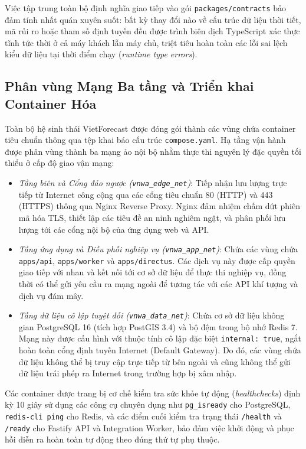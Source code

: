 Việc tập trung toàn bộ định nghĩa giao tiếp vào gói \texttt{packages/contracts} bảo đảm tính nhất quán xuyên suốt: bất kỳ thay đổi nào về cấu trúc dữ liệu thời tiết, mã rủi ro hoặc tham số định tuyến đều được trình biên dịch TypeScript xác thực tĩnh tức thời ở cả máy khách lẫn máy chủ, triệt tiêu hoàn toàn các lỗi sai lệch kiểu dữ liệu tại thời điểm chạy (\textit{runtime type errors}).

\subsection{Phân vùng Mạng Ba tầng và Triển khai Container Hóa}
Toàn bộ hệ sinh thái VietForecast được đóng gói thành các vùng chứa container tiêu chuẩn thông qua tệp khai báo cấu trúc \texttt{compose.yaml}. Hạ tầng vận hành được phân vùng thành ba mạng ảo nội bộ nhằm thực thi nguyên lý đặc quyền tối thiểu ở cấp độ giao vận mạng:
\begin{itemize}
    \item[-] \textit{Tầng biên và Cổng đảo ngược (\texttt{vnwa\_edge\_net})}: Tiếp nhận lưu lượng trực tiếp từ Internet công cộng qua các cổng tiêu chuẩn 80 (HTTP) và 443 (HTTPS) thông qua Nginx Reverse Proxy. Nginx đảm nhiệm chấm dứt phiên mã hóa TLS, thiết lập các tiêu đề an ninh nghiêm ngặt, và phân phối lưu lượng tới các cổng nội bộ của ứng dụng web và API.
    \item[-] \textit{Tầng ứng dụng và Điều phối nghiệp vụ (\texttt{vnwa\_app\_net})}: Chứa các vùng chứa \texttt{apps/api}, \texttt{apps/worker} và \texttt{apps/directus}. Các dịch vụ này được cấp quyền giao tiếp với nhau và kết nối tới cơ sở dữ liệu để thực thi nghiệp vụ, đồng thời có thể gửi yêu cầu ra mạng ngoài để tương tác với các API khí tượng và dịch vụ đám mây.
    \item[-] \textit{Tầng dữ liệu cô lập tuyệt đối (\texttt{vnwa\_data\_net})}: Chứa cơ sở dữ liệu không gian PostgreSQL 16 (tích hợp PostGIS 3.4) và bộ đệm trong bộ nhớ Redis 7. Mạng này được cấu hình với thuộc tính cô lập đặc biệt \texttt{internal: true}, ngắt hoàn toàn cổng định tuyến Internet (Default Gateway). Do đó, các vùng chứa dữ liệu không thể bị truy cập trực tiếp từ bên ngoài và cũng không thể gửi dữ liệu trái phép ra Internet trong trường hợp bị xâm nhập.
\end{itemize}

Các container được trang bị cơ chế kiểm tra sức khỏe tự động (\textit{healthchecks}) định kỳ 10 giây sử dụng các công cụ chuyên dụng như \texttt{pg\_isready} cho PostgreSQL, \texttt{redis-cli ping} cho Redis, và các điểm cuối kiểm tra trạng thái \texttt{/health} và \texttt{/ready} cho Fastify API và Integration Worker, bảo đảm việc khởi động và phục hồi diễn ra hoàn toàn tự động theo đúng thứ tự phụ thuộc.


